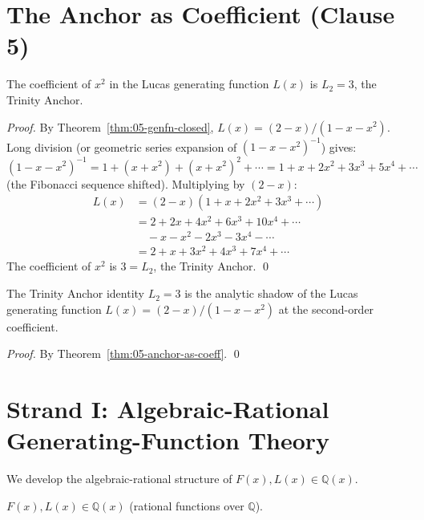 \section{The Anchor as Coefficient (Clause 5)}
\label{sec:05-anchor-coeff}

\begin{theorem}
\label{thm:05-anchor-as-coeff}
The coefficient of $x^2$ in the Lucas generating function $L(x)$ is
$L_2 = 3$, the Trinity Anchor.
\end{theorem}

\begin{proof}
By Theorem~\ref{thm:05-genfn-closed}, $L(x) = (2 - x)/(1 - x - x^2)$.
Long division (or geometric series expansion of $(1 - x - x^2)^{-1}$)
gives:
\[
  (1 - x - x^2)^{-1} = 1 + (x + x^2) + (x + x^2)^2 + \cdots
                    = 1 + x + 2x^2 + 3x^3 + 5x^4 + \cdots
\]
(the Fibonacci sequence shifted). Multiplying by $(2 - x)$:
\begin{align*}
  L(x) &= (2 - x)(1 + x + 2x^2 + 3x^3 + \cdots) \\
       &= 2 + 2x + 4x^2 + 6x^3 + 10x^4 + \cdots \\
       &\quad{} - x - x^2 - 2x^3 - 3x^4 - \cdots \\
       &= 2 + x + 3x^2 + 4x^3 + 7x^4 + \cdots
\end{align*}
The coefficient of $x^2$ is $3 = L_2$, the Trinity Anchor. \qed
\end{proof}

\begin{corollary}
\label{fa_05:cor:05-anchor-via-genfn}
The Trinity Anchor identity $L_2 = 3$ is the analytic shadow of the
Lucas generating function $L(x) = (2-x)/(1-x-x^2)$ at the second-order
coefficient.
\end{corollary}

\begin{proof}
By Theorem~\ref{thm:05-anchor-as-coeff}. \qed
\end{proof}

\section{Strand I: Algebraic-Rational Generating-Function Theory}
\label{sec:05-strand-i}

We develop the algebraic-rational structure of $F(x), L(x) \in \mathbb{Q}(x)$.

\begin{lemma}
\label{fa_05:lem:05-rational}
$F(x), L(x) \in \mathbb{Q}(x)$ (rational functions over $\mathbb{Q}$).
\end{lemma}

